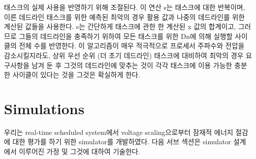\documentclass[11pt
  , a4paper
  , article
  , oneside
]{memoir}
\begin{document}
태스크의 실제 사용을 반영하기 위해 조절된다. 이 연산 s는 태스크에 대한 반복이며, 이른 데드라인 태스크를 위한 예측된 최악의 경우 활용 값과  나중의 데드라인를 위한 계산된 값들을 사용한다. s는 간단하게 태스크에 관한 한 계산된 x 값의 합계이고, 그러므로 그들의 데드라인을 충족하기 위하여  모든 태스크를 위한 Dn에 의해 실행할 사이클의 전체 수를 반영한다. 이 알고리즘이 매우 적극적으로 프로세서 주파수와 전압을 감소시킬지라도, 상위 우선 순위 (더 초기 데드라인) 태스크에 대비하여 최악의 경우 요구사항을 남겨 둔 후 그것의 데드라인에 맞추는 것이 각각 태스크에 이용 가능한 충분한 사이클이 있다는 것을 그것은 확실하게 한다. 

\clearpage
\chapter{Simulations}
우리는 real-time scheduled system에서 voltage scaling으로부터 잠재적 에너지 절감에 대한 평가를 하기 위한 simulator를 개발하였다. 다음 서브 섹션은 simulator 설계에서 이루어진 가정 및 그것에 대하여 기술한다.
\end{document}
